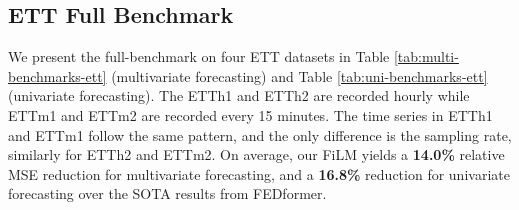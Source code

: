 \documentclass{article}
\begin{document}
\subsection{ETT Full Benchmark}
\label{app:exp:ett_benchmark}
We present the full-benchmark on four ETT datasets \cite{haoyietal-informer-2021} in Table \ref{tab:multi-benchmarks-ett} (multivariate forecasting) and Table \ref{tab:uni-benchmarks-ett} (univariate forecasting). The ETTh1 and ETTh2 are recorded hourly while ETTm1 and ETTm2 are recorded every 15 minutes. The time series in ETTh1 and ETTm1 follow the same pattern, and the only difference is the sampling rate, similarly for ETTh2 and ETTm2. On average, our 
FiLM yields a \textbf{14.0\%} relative MSE reduction for multivariate forecasting, and a \textbf{16.8\%} reduction for univariate forecasting over the SOTA results from FEDformer.
\label{app:ETT}
\end{document}
